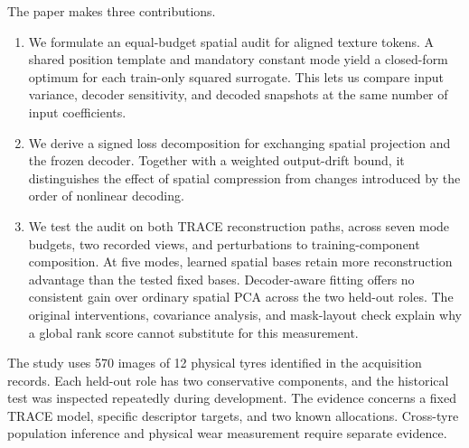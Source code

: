 The paper makes three contributions.
\begin{enumerate}
\item We formulate an equal-budget spatial audit for aligned texture tokens. A shared position template and mandatory constant mode yield a closed-form optimum for each train-only squared surrogate. This lets us compare input variance, decoder sensitivity, and decoded snapshots at the same number of input coefficients.
\item We derive a signed loss decomposition for exchanging spatial projection and the frozen decoder. Together with a weighted output-drift bound, it distinguishes the effect of spatial compression from changes introduced by the order of nonlinear decoding.
\item We test the audit on both TRACE reconstruction paths, across seven mode budgets, two recorded views, and perturbations to training-component composition. At five modes, learned spatial bases retain more reconstruction advantage than the tested fixed bases. Decoder-aware fitting offers no consistent gain over ordinary spatial PCA across the two held-out roles. The original interventions, covariance analysis, and mask-layout check explain why a global rank score cannot substitute for this measurement.
\end{enumerate}

The study uses 570 images of 12 physical tyres identified in the acquisition records. Each held-out role has two conservative components, and the historical test was inspected repeatedly during development. The evidence concerns a fixed TRACE model, specific descriptor targets, and two known allocations. Cross-tyre population inference and physical wear measurement require separate evidence.
